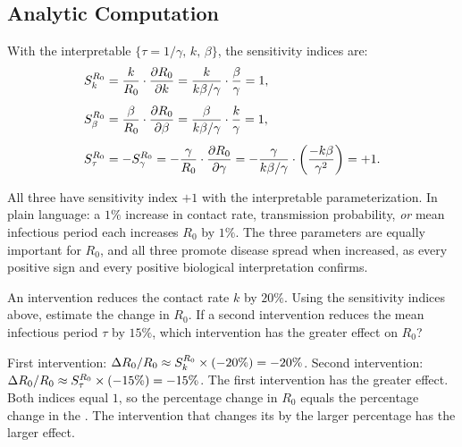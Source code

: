 \subsection{Analytic Computation}
\label{subsec:R0SI}

With the interpretable \POIs $\{\tau = 1/\gamma,\, k,\, \beta\}$,
the sensitivity indices are:
\begin{align}
  S_{k}^{R_0} &= \frac{k}{R_0}\cdot\frac{\partial R_0}{\partial k}
                = \frac{k}{k\beta/\gamma}\cdot\frac{\beta}{\gamma} = 1,
                \label{eq:R0k} \\[4pt]
  S_{\beta}^{R_0} &= \frac{\beta}{R_0}\cdot\frac{\partial R_0}{\partial\beta}
                    = \frac{\beta}{k\beta/\gamma}\cdot\frac{k}{\gamma} = 1,
                    \label{eq:R0beta} \\[4pt]
  S_{\tau}^{R_0} &= -S_{\gamma}^{R_0}
                   = -\frac{\gamma}{R_0}\cdot\frac{\partial R_0}{\partial\gamma}
                   = -\frac{\gamma}{k\beta/\gamma}\cdot\left(\frac{-k\beta}{\gamma^2}\right) = +1.
                    \label{eq:R0tau}
\end{align}

All three \POIs have sensitivity index $+1$ with the interpretable
parameterization. In plain language: a $1\%$ increase in contact rate,
transmission probability, \emph{or} mean infectious period each
increases $R_0$ by $1\%$. The three parameters are equally important
for $R_0$, and all three promote disease spread when increased,
as every positive sign and every positive biological interpretation
confirms.

\begin{selfcheck}
An intervention reduces the contact rate $k$ by $20\%$.
Using the sensitivity indices above, estimate the change in $R_0$.
If a second intervention reduces the mean infectious period $\tau$
by $15\%$, which intervention has the greater effect on $R_0$?
\end{selfcheck}
\begin{scAnswer}
First intervention: $\Delta R_0/R_0 \approx S_{k}^{R_0}\times(-20\%) = -20\%$.
Second intervention: $\Delta R_0/R_0 \approx S_{\tau}^{R_0}\times(-15\%) = -15\%$.
The first intervention has the greater effect. Both indices equal $1$,
so the percentage change in $R_0$ equals the percentage change in the \POI.
The intervention that changes its \POI by the larger percentage
has the larger effect.
\end{scAnswer}

